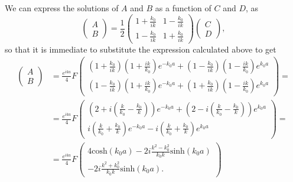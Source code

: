 We can express the solutions of \(A\) and \(B\) as a function of \(C\) and \(D\), as
 \begin{equation*}
    \left( \begin{array}{c}
    A \\
    B
    \end{array} \right) 
    = \frac{1}{2}
    \left( \begin{array}{cc}
    1+\frac{k_0}{ik} & 1-\frac{k_0}{ik}\\
    1-\frac{k_0}{ik} & 1+\frac{k_0}{ik}
    \end{array} \right)
    \left( \begin{array}{c}
    C \\
    D
    \end{array}
    \right),
\end{equation*}
so that it is immediate to substitute the expression calculated above to get 
\begin{equation*}
\begin{split}
     \left( \begin{array}{c}
    A \\
    B
    \end{array} \right) 
    & = \frac{e^{ika}}{4}F
    \left( \begin{array}{c}
    \left(1+\frac{k_0}{ik}\right)\left(1+\frac{ik}{k_0}\right)e^{-k_0a} + \left(1-\frac{k_0}{ik}\right)\left(1-\frac{ik}{k_0}\right)e^{k_0a}\\
    \left(1-\frac{k_0}{ik}\right)\left(1+\frac{ik}{k_0}\right)e^{-k_0a} + \left(1+\frac{k_0}{ik}\right)\left(1-\frac{ik}{k_0}\right)e^{k_0a}
    \end{array} \right) = \\
    & = \frac{e^{ika}}{4}F
    \left( \begin{array}{c}
    \left(2+i\left(\frac{k}{k_0}-\frac{k_0}{k}\right)\right)e^{-k_0a} + \left(2-i\left(\frac{k}{k_0}-\frac{k_0}{k}\right)\right)e^{k_0a}\\
    i\left(\frac{k}{k_0}+\frac{k_0}{k}\right)e^{-k_0a} - i\left(\frac{k}{k_0} + \frac{k_0}{k}\right) e^{k_0a}
    \end{array}
    \right) = \\
    & = \frac{e^{ika}}{4}F\left(
    \begin{array}{c}
    4\mbox{cosh}(k_0a) - 2i\frac{k^2-k_0^2}{k_0k}\mbox{sinh}(k_0a)\\
    -2i\frac{k^2+k_0^2}{k_0k}\mbox{sinh}(k_0a).
    \end{array}
    \right)
\end{split}
\end{equation*}
